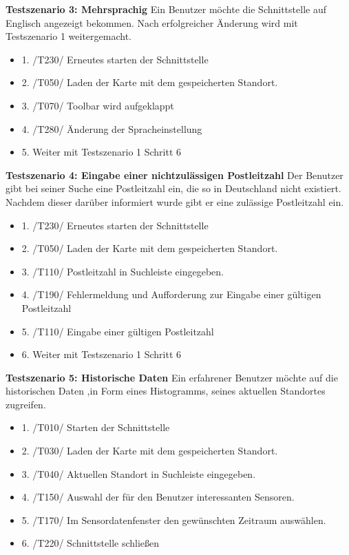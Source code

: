 \textbf{Testszenario 3: Mehrsprachig}
\newline
Ein Benutzer möchte die Schnittstelle auf Englisch angezeigt bekommen. Nach erfolgreicher Änderung wird mit Testszenario 1 weitergemacht.
\begin{itemize} [noitemsep]
    \item 1. /T230/ Erneutes starten der Schnittstelle
    \item 2. /T050/ Laden der Karte mit dem gespeicherten Standort.
    \item 3. /T070/ Toolbar wird aufgeklappt
    \item 4. /T280/ Änderung der Spracheinstellung
    \item 5. Weiter mit Testszenario 1 Schritt 6
\end{itemize}

\textbf{Testszenario 4: Eingabe einer nichtzulässigen Postleitzahl}
\newline
Der Benutzer gibt bei seiner Suche eine Postleitzahl ein, die so in Deutschland nicht existiert. Nachdem dieser darüber informiert wurde gibt er eine zulässige Postleitzahl ein.
\begin{itemize} [noitemsep]
    \item 1. /T230/ Erneutes starten der Schnittstelle
    \item 2. /T050/ Laden der Karte mit dem gespeicherten Standort.
    \item 3. /T110/ Postleitzahl in Suchleiste eingegeben.
    \item 4. /T190/ Fehlermeldung und Aufforderung zur Eingabe einer gültigen Postleitzahl
    \item 5. /T110/ Eingabe einer gültigen Postleitzahl
    \item 6. Weiter mit Testszenario 1 Schritt 6
\end{itemize}

\textbf{Testszenario 5: Historische Daten}
\newline
Ein erfahrener Benutzer möchte auf die historischen Daten ,in Form eines Histogramms, seines aktuellen Standortes zugreifen.
\begin{itemize} [noitemsep]
    \item 1. /T010/ Starten der Schnittstelle
    \item 2. /T030/ Laden der Karte mit dem gespeicherten Standort.
    \item 3. /T040/ Aktuellen Standort in Suchleiste eingegeben.
    \item 4. /T150/ Auswahl der für den Benutzer interessanten Sensoren.
    \item 5. /T170/ Im Sensordatenfenster den gewünschten Zeitraum auswählen.
    \item 6. /T220/ Schnittstelle schließen
\end{itemize}


